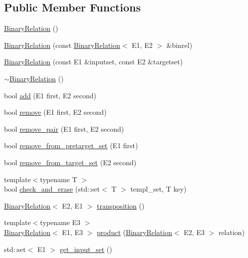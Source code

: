\subsection*{Public Member Functions}
\begin{DoxyCompactItemize}
\item 
\hyperlink{classBinaryRelation_a7584a6c9b21ce062737d776b3790f30c}{Binary\+Relation} ()
\item 
\hyperlink{classBinaryRelation_a94a2796b569f98d07f1c3662ec01706d}{Binary\+Relation} (const \hyperlink{classBinaryRelation}{Binary\+Relation}$<$ E1, E2 $>$ \&binrel)
\item 
\hyperlink{classBinaryRelation_aad68b809d5a88cad7589c1c0c6507307}{Binary\+Relation} (const E1 \&inputset, const E2 \&targetset)
\item 
\hyperlink{classBinaryRelation_a962cb01ecccb3f3c4ce821925f91ecd6}{$\sim$\+Binary\+Relation} ()
\item 
bool \hyperlink{classBinaryRelation_a50e035f8c6a6ea0f3d410100200bf8ff}{add} (E1 first, E2 second)
\item 
bool \hyperlink{classBinaryRelation_a8ae41ea2181d7cc5d1707c4584e8ebe0}{remove} (E1 first, E2 second)
\item 
bool \hyperlink{classBinaryRelation_a99c4077f22f057fc0fd4294d57be22a2}{remove\+\_\+pair} (E1 first, E2 second)
\item 
bool \hyperlink{classBinaryRelation_af8a9dd2f77b61656784a3a839264f6c4}{remove\+\_\+from\+\_\+pretarget\+\_\+set} (E1 first)
\item 
bool \hyperlink{classBinaryRelation_a440767b58c9070ea5fd1d94dfbd22c62}{remove\+\_\+from\+\_\+target\+\_\+set} (E2 second)
\item 
{\footnotesize template$<$typename T $>$ }\\bool \hyperlink{classBinaryRelation_a96805510d13dac057a06d16a27196447}{check\+\_\+and\+\_\+erase} (std\+::set$<$ T $>$ templ\+\_\+set, T key)
\item 
\hyperlink{classBinaryRelation}{Binary\+Relation}$<$ E2, E1 $>$ \hyperlink{classBinaryRelation_af18e09570203d804f5bb36cc5e6da75b}{transposition} ()
\item 
{\footnotesize template$<$typename E3 $>$ }\\\hyperlink{classBinaryRelation}{Binary\+Relation}$<$ E1, E3 $>$ \hyperlink{classBinaryRelation_a5bb10d4cea0215ed647beec54f862414}{product} (\hyperlink{classBinaryRelation}{Binary\+Relation}$<$ E2, E3 $>$ relation)
\item 
std\+::set$<$ E1 $>$ \hyperlink{classBinaryRelation_a14bd1065b37bbf0793eb39dde25adf3b}{get\+\_\+input\+\_\+set} ()

\end{DoxyCompactItemize}
